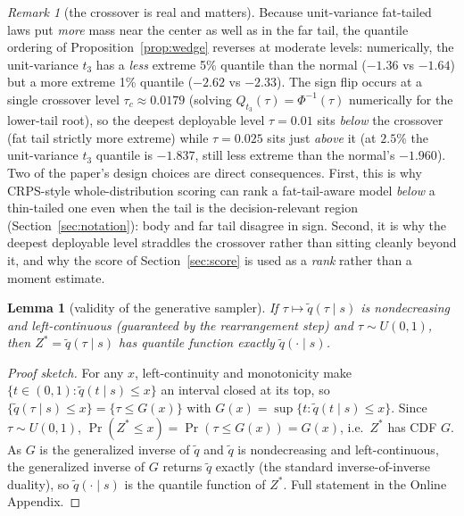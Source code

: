 \documentclass[11pt]{article}
\newtheorem{lemma}{Lemma}
\theoremstyle{remark}
\newtheorem{remark}{Remark}
\begin{document}
\begin{remark}[the crossover is real and matters]\label{rem:crossover}
Because unit-variance fat-tailed laws put \emph{more} mass near the
center as well as in the far tail, the quantile ordering of
Proposition~\ref{prop:wedge} reverses at moderate levels: numerically,
the unit-variance $t_3$ has a \emph{less} extreme 5\% quantile than the
normal ($-1.36$ vs $-1.64$) but a more extreme 1\% quantile ($-2.62$ vs
$-2.33$). The sign flip occurs at a single crossover level
$\tau_c \approx 0.0179$ (solving $Q_{t_3}(\tau)=\Phi^{-1}(\tau)$
numerically for the lower-tail root), so the deepest deployable level
$\tau = 0.01$ sits \emph{below} the crossover (fat tail strictly more
extreme) while $\tau = 0.025$ sits just \emph{above} it (at $2.5\%$ the
unit-variance $t_3$ quantile is $-1.837$, still less extreme than the
normal's $-1.960$). Two of the paper's design choices are direct
consequences. First, this is why CRPS-style whole-distribution
scoring can rank a fat-tail-aware model \emph{below} a thin-tailed one
even when the tail is the decision-relevant region
(Section~\ref{sec:notation}): body and far tail disagree in sign.
Second, it is why the deepest deployable level straddles the crossover
rather than sitting cleanly beyond it, and why the score of
Section~\ref{sec:score} is used as a \emph{rank} rather than a moment
estimate.
\end{remark}

\begin{lemma}[validity of the generative sampler]\label{lem:sampler}
If $\tau \mapsto \widetilde{q}(\tau \mid s)$ is nondecreasing and
left-continuous (guaranteed by the rearrangement step) and
$\tau \sim U(0,1)$, then $Z^* = \widetilde{q}(\tau \mid s)$ has
quantile function exactly $\widetilde{q}(\cdot \mid s)$.
\end{lemma}
\begin{proof}[Proof sketch]
For any $x$, left-continuity and monotonicity make
$\{t\in(0,1):\widetilde{q}(t\mid s)\le x\}$ an interval closed at its
top, so $\{\widetilde q(\tau\mid s)\le x\}=\{\tau\le G(x)\}$ with
$G(x)=\sup\{t:\widetilde q(t\mid s)\le x\}$. Since $\tau\sim U(0,1)$,
$\Pr(Z^*\le x)=\Pr(\tau\le G(x))=G(x)$, i.e.\ $Z^*$ has CDF $G$. As $G$
is the generalized inverse of $\widetilde q$ and $\widetilde q$ is
nondecreasing and left-continuous, the generalized inverse of $G$
returns $\widetilde q$ exactly (the standard inverse-of-inverse
duality), so $\widetilde q(\cdot\mid s)$ is the quantile function of
$Z^*$. Full statement in the Online Appendix.
\end{proof}
\end{document}
